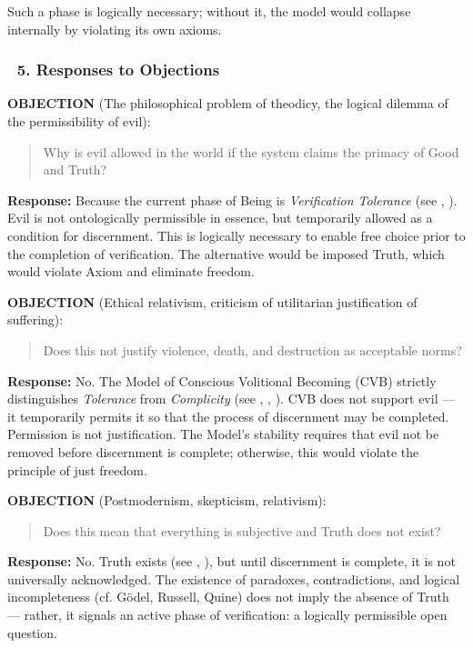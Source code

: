 \documentclass[12pt]{article}
\begin{document}
Such a phase is logically necessary; without it, the model would collapse internally by violating its own axioms.

\subsubsection*{🔹 5. Responses to Objections}

\textbf{OBJECTION} (The philosophical problem of theodicy, the logical dilemma of the permissibility of evil):  
\begin{quote}
Why is evil allowed in the world if the system claims the primacy of Good and Truth?
\end{quote}
\textbf{Response:} Because the current phase of Being is \textit{Verification Tolerance} (see \text{[25]}, \text{[26]}). Evil is not ontologically permissible in essence, but temporarily allowed as a condition for discernment. This is logically necessary to enable free choice prior to the completion of verification. The alternative would be imposed Truth, which would violate Axiom \text{[13]} and eliminate freedom.

\textbf{OBJECTION} (Ethical relativism, criticism of utilitarian justification of suffering):  
\begin{quote}
Does this not justify violence, death, and destruction as acceptable norms?
\end{quote}
\textbf{Response:} No. The Model of Conscious Volitional Becoming (CVB) strictly distinguishes \textit{Tolerance} from \textit{Complicity} (see \text{[16]}, \text{[23]}, \text{[24.4]}). CVB does not support evil — it temporarily permits it so that the process of discernment may be completed. Permission is not justification. The Model’s stability requires that evil not be removed before discernment is complete; otherwise, this would violate the principle of just freedom.

\textbf{OBJECTION} (Postmodernism, skepticism, relativism):  
\begin{quote}
Does this mean that everything is subjective and Truth does not exist?
\end{quote}
\textbf{Response:} No. Truth exists (see \text{[11.2.1]}, \text{[12.1]}), but until discernment is complete, it is not universally acknowledged. The existence of paradoxes, contradictions, and logical incompleteness (cf. Gödel, Russell, Quine) does not imply the absence of Truth — rather, it signals an active phase of verification: a logically permissible open question.
\end{document}
